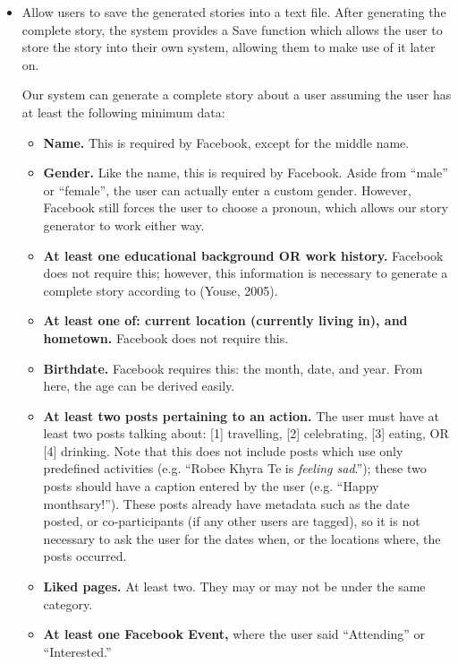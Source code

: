 \begin{itemize}
	\item Allow users to save the generated stories into a text file. \newline\newline
	After generating the complete story, the system provides a Save function which allows the user to store the story into their own system, allowing them to make use of it later on. \newline\newline
	
	Our system can generate a complete story about a user assuming the user has at least the following minimum data:
	\begin{itemize}
		\item \textbf{Name.} This is required by Facebook, except for the middle name.
		\item \textbf{Gender.} Like the name, this is required by Facebook. Aside from ``male” or ``female”, the user can actually enter a custom gender. However, Facebook still forces the user to choose a pronoun, which allows our story generator to work either way.
		\item \textbf{At least one educational background OR work history.} Facebook does not require this; however, this information is necessary to generate a complete story according to (Youse, 2005).
		\item \textbf{At least one of: current location (currently living in), and hometown.} Facebook does not require this.
		\item \textbf{Birthdate.} Facebook requires this: the month, date, and year. From here, the age can be derived easily.
		\item \textbf{At least two posts pertaining to an action.} The user must have at least two posts talking about: [1] travelling, [2] celebrating, [3] eating, OR [4] drinking. Note that this does not include posts which use only predefined activities (e.g. ``Robee Khyra Te is \textit{feeling sad}.”); these two posts should have a caption entered by the user (e.g. ``Happy monthsary!”). These posts already have metadata such as the date posted, or co-participants (if any other users are tagged), so it is not necessary to ask the user for the dates when, or the  locations where, the posts occurred.
		\item \textbf{Liked pages.} At least two. They may or may not be under the same category.
		\item \textbf{At least one Facebook Event,} where the user said ``Attending” or ``Interested.”
	\end{itemize}
	

\end{itemize}
